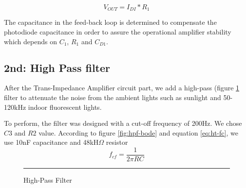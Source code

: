 \begin{equation}
V_{OUT}  = I_{DI} * R_{1}
\label{eq:vout}
\end{equation}

The capacitance in the feed-back loop is determined to compensate the photodiode capacitance in order to assure the operational amplifier stability which depends on $C_1$, $R_1$ and $C_{D1}$.

\subsection{2nd: High Pass filter}

After the Trans-Impedance Amplifier circuit part, we add a high-pass (figure \ref{fig:hpf} filter to attenuate the noise from the ambient lights such as sunlight and 50-120kHz indoor fluorescent lights.

To perform, the filter was designed with a cut-off frequency of 200Hz. We chose $C3$ and $R2$ value. According to figure \ref{fig:hpf-bode} and equation \ref{eq:ht-fc}, we use 10nF capacitance and 48kH$\Omega$ resistor
\begin{equation}
f_{cf}  = \frac{1}{2\pi RC}
\label{eq:ht-fc}
\end{equation}

\begin{figure}[htbp]
    \centering
    \rule{35em}{0.5pt}
    \caption{High-Pass Filter}
    \label{fig:hpf}
\end{figure}

